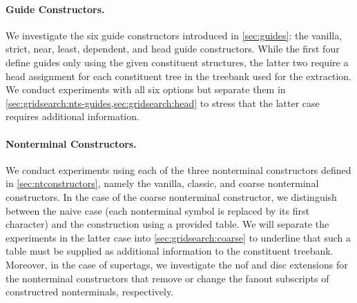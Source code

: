 \documentclass[../../document.tex]{subfiles}
\begin{document}
    \paragraph*{Guide Constructors.}
    We investigate the six guide constructors introduced in \cref{sec:guides}: the vanilla, strict, near, least, dependent, and head guide constructors.
    While the first four define guides only using the given constituent structures, the latter two require a head assignment for each constituent tree in the treebank used for the extraction.
    We conduct experiments with all six options but separate them in \cref{sec:gridsearch:nts-guides,sec:gridsearch:head} to stress that the latter case requires additional information.

    \paragraph*{Nonterminal Constructors.}
    We conduct experiments using each of the three nonterminal constructors defined in \cref{sec:ntconstructors}, namely the vanilla, classic, and coarse nonterminal constructors.
    In the case of the coarse nonterminal constructor, we distinguish between the naive case (each nonterminal symbol is replaced by its first character) and the construction using a provided table.
    We will separate the experiments in the latter case into \cref{sec:gridsearch:coarse} to underline that such a table must be supplied as additional information to the constituent treebank.
    Moreover, in the case of  supertags, we investigate the nof and disc extensions for the nonterminal constructors that remove or change the fanout subscripts of constructred nonterminals, respectively.
\end{document}
